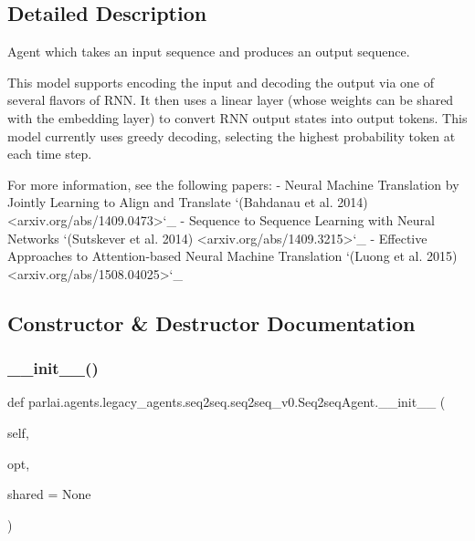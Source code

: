 \subsection{Detailed Description}
\begin{DoxyVerb}Agent which takes an input sequence and produces an output sequence.

This model supports encoding the input and decoding the output via one of
several flavors of RNN. It then uses a linear layer (whose weights can
be shared with the embedding layer) to convert RNN output states into
output tokens. This model currently uses greedy decoding, selecting the
highest probability token at each time step.

For more information, see the following papers:
- Neural Machine Translation by Jointly Learning to Align and Translate
  `(Bahdanau et al. 2014) <arxiv.org/abs/1409.0473>`_
- Sequence to Sequence Learning with Neural Networks
  `(Sutskever et al. 2014) <arxiv.org/abs/1409.3215>`_
- Effective Approaches to Attention-based Neural Machine Translation
  `(Luong et al. 2015) <arxiv.org/abs/1508.04025>`_
\end{DoxyVerb}
 

\subsection{Constructor \& Destructor Documentation}
\mbox{\label{classparlai_1_1agents_1_1legacy__agents_1_1seq2seq_1_1seq2seq__v0_1_1Seq2seqAgent_a88801410eefdb0b71bb674a0768e87b9}} 
\subsubsection{\texorpdfstring{\+\_\+\+\_\+init\+\_\+\+\_\+()}{\_\_init\_\_()}}
{\footnotesize\ttfamily def parlai.\+agents.\+legacy\+\_\+agents.\+seq2seq.\+seq2seq\+\_\+v0.\+Seq2seq\+Agent.\+\_\+\+\_\+init\+\_\+\+\_\+ (\begin{DoxyParamCaption}\item[{}]{self,  }\item[{}]{opt,  }\item[{}]{shared = {\ttfamily None} }\end{DoxyParamCaption})}

